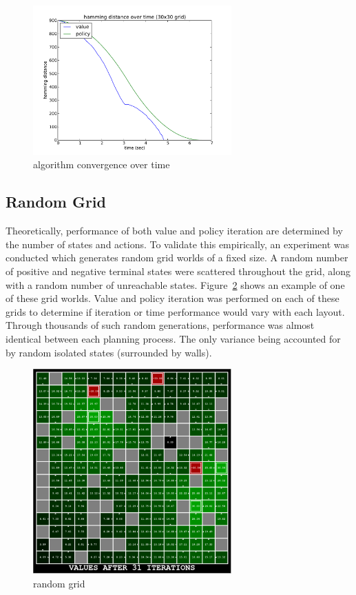 \documentclass{sig-alternate}
\begin{document}
\begin{figure}[!htbp]
    \centering
    \includegraphics[width=3in]{images/simple/hd.pdf}
    \caption{algorithm convergence over time \label{simple-hd}}
\end{figure} 


\subsection{Random Grid}

Theoretically, performance of both value and policy iteration are determined by the number of states and actions. To validate this empirically, an experiment was conducted which generates random grid worlds of a fixed size. A random number of positive and negative terminal states were scattered throughout the grid, along with a random number of unreachable states. Figure~\ref{random} shows an example of one of these grid worlds. Value and policy iteration was performed on each of these grids to determine if iteration or time performance would vary with each layout. Through thousands of such random generations, performance was almost identical between each planning process. The only variance being accounted for by random isolated states (surrounded by walls).

\begin{figure}[!htbp]
    \centering
    \includegraphics[width=3in]{images/random.pdf}
    \caption{random grid \label{random}}
\end{figure} 
\end{document}
